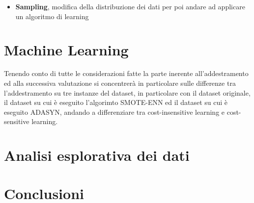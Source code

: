 \documentclass[italian,12pt,a4paper]{article}
\begin{document}
	\begin{itemize}
		\item \textbf{Sampling}, modifica della distribuzione dei dati per poi andare ad applicare un algoritmo di learning
	\end{itemize}
	
	\section{Machine Learning}
	Tenendo conto di tutte le considerazioni fatte la parte inerente all'addestramento ed alla successiva valutazione si concentrerà in particolare sulle differenze tra l'addestramento su tre instanze del dataset, in particolare con il dataset originale, il dataset su cui è eseguito l'algorimto SMOTE-ENN ed il dataset su cui è eseguito ADASYN, andando a differenziare tra cost-insensitive learning e cost-sensitive learning.
	
	   
	
	
	




	\section{Analisi esplorativa dei dati}

	\section{Conclusioni}
	

	
\end{document}
